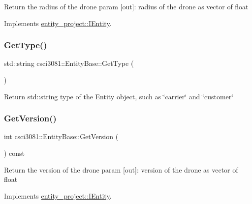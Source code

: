 Return the radius of the drone param \mbox{[}out\mbox{]}\+: radius of the drone as vector of float 

Implements \hyperlink{classentity__project_1_1IEntity_af2c2f81a5d201c4c1968f055808ba59c}{entity\+\_\+project\+::\+I\+Entity}.

\mbox{\label{classcsci3081_1_1EntityBase_ac2efc31e2a346b29897f711c44b71ecb}} 
\subsubsection{\texorpdfstring{Get\+Type()}{GetType()}}
{\footnotesize\ttfamily std\+::string csci3081\+::\+Entity\+Base\+::\+Get\+Type (\begin{DoxyParamCaption}{ }\end{DoxyParamCaption})}

Return std\+::string type of the Entity object, such as \char`\"{}carrier\char`\"{} and \char`\"{}customer\char`\"{} \mbox{\label{classcsci3081_1_1EntityBase_af5c87e8daf9161dc8c959c355b076bea}} 
\subsubsection{\texorpdfstring{Get\+Version()}{GetVersion()}}
{\footnotesize\ttfamily int csci3081\+::\+Entity\+Base\+::\+Get\+Version (\begin{DoxyParamCaption}{ }\end{DoxyParamCaption}) const\hspace{0.3cm}{\ttfamily [virtual]}}

Return the version of the drone param \mbox{[}out\mbox{]}\+: version of the drone as vector of float 

Implements \hyperlink{classentity__project_1_1IEntity_a254b8c22f103ebf23261cb79bc121118}{entity\+\_\+project\+::\+I\+Entity}.

\mbox{\label{classcsci3081_1_1EntityBase_aa2a894f7821745acd91fbfb2e2e92082}} 
